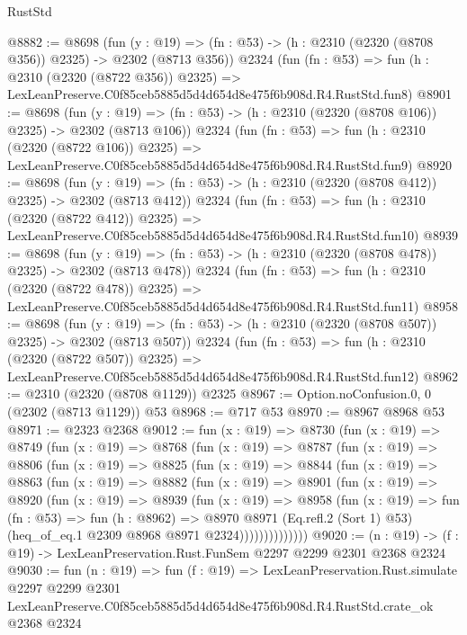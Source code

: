 \begin{lexlean}{RustStd}
\begin{coremodule}
@8882 := @8698
    (fun (y : @19) => (fn : @53) -> (h : @2310 (@2320 (@8708 @356)) @2325) -> @2302 (@8713 @356))
    @2324
    (fun (fn : @53) =>
    fun (h : @2310 (@2320 (@8722 @356)) @2325) =>
    LexLeanPreserve.C0f85ceb5885d5d4d654d8e475f6b908d.R4.RustStd.fun8)
@8901 := @8698
    (fun (y : @19) => (fn : @53) -> (h : @2310 (@2320 (@8708 @106)) @2325) -> @2302 (@8713 @106))
    @2324
    (fun (fn : @53) =>
    fun (h : @2310 (@2320 (@8722 @106)) @2325) =>
    LexLeanPreserve.C0f85ceb5885d5d4d654d8e475f6b908d.R4.RustStd.fun9)
@8920 := @8698
    (fun (y : @19) => (fn : @53) -> (h : @2310 (@2320 (@8708 @412)) @2325) -> @2302 (@8713 @412))
    @2324
    (fun (fn : @53) =>
    fun (h : @2310 (@2320 (@8722 @412)) @2325) =>
    LexLeanPreserve.C0f85ceb5885d5d4d654d8e475f6b908d.R4.RustStd.fun10)
@8939 := @8698
    (fun (y : @19) => (fn : @53) -> (h : @2310 (@2320 (@8708 @478)) @2325) -> @2302 (@8713 @478))
    @2324
    (fun (fn : @53) =>
    fun (h : @2310 (@2320 (@8722 @478)) @2325) =>
    LexLeanPreserve.C0f85ceb5885d5d4d654d8e475f6b908d.R4.RustStd.fun11)
@8958 := @8698
    (fun (y : @19) => (fn : @53) -> (h : @2310 (@2320 (@8708 @507)) @2325) -> @2302 (@8713 @507))
    @2324
    (fun (fn : @53) =>
    fun (h : @2310 (@2320 (@8722 @507)) @2325) =>
    LexLeanPreserve.C0f85ceb5885d5d4d654d8e475f6b908d.R4.RustStd.fun12)
@8962 := @2310 (@2320 (@8708 @1129)) @2325
@8967 := Option.noConfusion.{0, 0} (@2302 (@8713 @1129)) @53
@8968 := @717 @53
@8970 := @8967 @8968 @53
@8971 := @2323 @2368
@9012 := fun (x : @19) =>
  @8730
    (fun (x : @19) =>
    @8749
      (fun (x : @19) =>
      @8768
        (fun (x : @19) =>
        @8787
          (fun (x : @19) =>
          @8806
            (fun (x : @19) =>
            @8825
              (fun (x : @19) =>
              @8844
                (fun (x : @19) =>
                @8863
                  (fun (x : @19) =>
                  @8882
                    (fun (x : @19) =>
                    @8901
                      (fun (x : @19) =>
                      @8920
                        (fun (x : @19) =>
                        @8939
                          (fun (x : @19) =>
                          @8958
                            (fun (x : @19) =>
                            fun (fn : @53) =>
                            fun (h : @8962) =>
                            @8970
                              @8971
                              (Eq.refl.{2} (Sort 1) @53)
                              (heq_of_eq.{1} @2309 @8968 @8971 @2324))))))))))))))
@9020 := (n : @19) -> (f : @19) -> LexLeanPreservation.Rust.FunSem @2297 @2299 @2301 @2368 @2324
@9030 := fun (n : @19) =>
  fun (f : @19) =>
  LexLeanPreservation.Rust.simulate
    @2297
    @2299
    @2301
    LexLeanPreserve.C0f85ceb5885d5d4d654d8e475f6b908d.R4.RustStd.crate_ok
    @2368
    @2324
\end{coremodule}
\end{lexlean}

